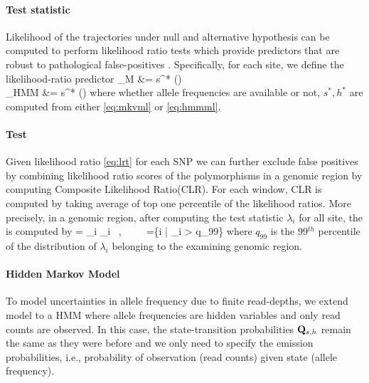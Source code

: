 \documentclass[11pt]{article}
\def\comale{\text{COMALE }}
\begin{document}
\paragraph{Test statistic}
Likelihood of the trajectories under null and alternative 
hypothesis can be 
computed to perform likelihood ratio tests which provide 
predictors that are 
robust to pathological false-positives 
\cite{feder2014Identifying}. 
Specifically, for each site, we define the likelihood-ratio 
predictor
\beq \label{eq:lrt}
\lambda_M &= s^*\log 
\left(\right)\\
\lambda_{HMM} &= s^*\log 
\left(\right)
\eeq
where whether allele frequencies are available or not, $s^*,h^*$ are computed from either \eqref{eq:mkvml} or \eqref{eq:hmmml}.
\paragraph{\comale Test}
Given likelihood ratio \eqref{eq:lrt} for each SNP we can further exclude false 
positives by combining likelihood ratio scores of the polymorphisms in a 
genomic region by computing Composite 
Likelihood 
Ratio(CLR)\cite{nielsen2005genomic,williamson2007localizing,vitti2013detecting}.
For each window, CLR is computed by taking average of top one percentile of the 
likelihood ratios.
More precisely, in a genomic region, after computing the test statistic ${\lambda_i}$ for all site, the \comale is computed by
\beq
\comale = \sum_{i \in \Ic} \lambda_i \ ,\ \ \ \ \ \Ic=\{i | \lambda_i > q_{99}\}
\eeq
where $q_{99}$ is the 99$^{th}$ percentile of the distribution of ${\lambda_i}$ belonging to the examining genomic region.
\paragraph{Hidden Markov Model}
To model uncertainties in allele frequency due to finite read-depths, we extend model to a HMM where allele frequencies are hidden variables and only read counts are observed. In this case, the state-transition probabilities ${\mathbf Q}_{s,h}$ remain the same as they were before and we only need to specify the emission probabilities, i.e., probability of observation (read counts) given state (allele frequency).
\end{document}
